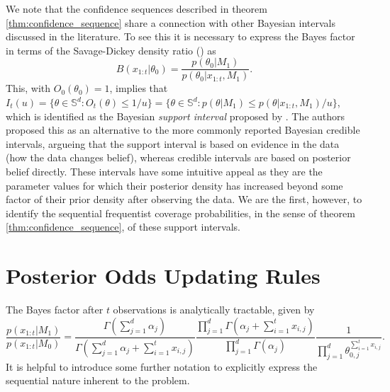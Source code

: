 \documentclass[11pt]{article}
\begin{document}
We note that the confidence sequences described in theorem \ref{thm:confidence_sequence} share a connection with other Bayesian intervals discussed in the literature.
To see this it is necessary to express the Bayes factor in terms of the Savage-Dickey density ratio (\cite{dickey}) as
\begin{equation}
    B(x_{1:t}|\theta_0) = \frac{p(\theta_0| M_1)}{p(\theta_0|x_{1:t},M_1)}.
\end{equation}
This, with $O_0(\theta_0)=1$, implies that $I_t(u) = \lbrace \theta \in \mathbb{S}^d : O_t(\theta) \leq 1/u \rbrace = \lbrace \theta  \in \mathbb{S}^d : p(\theta| M_1)\leq p(\theta|x_{1:t}, M_1)/u \rbrace $, which is identified as the Bayesian \textit{support interval} proposed by \cite{support_interval}.
The authors proposed this as an alternative to the more commonly reported Bayesian credible intervals, argueing that the support interval is based on evidence in the data (how the data changes belief), whereas credible intervals are based on posterior belief directly.
These intervals have some intuitive appeal as they are the parameter values for which their posterior density has increased beyond some factor of their prior density after observing the data.
We are the first, however, to identify the sequential frequentist coverage probabilities, in the sense of theorem \ref{thm:confidence_sequence}, of these support intervals.






\appendix
\section{Posterior Odds Updating Rules}
\label{app:posterior_odds}
The Bayes factor after $t$ observations is analytically tractable, given by
\begin{equation}
  \label{eq:bayes_factor}
 \frac{p(x_{1:t}|M_1)}{p(x_{1:t}|M_0)} = \frac{\Gamma(\sum_{j=1}^{d} \alpha_j)}{\Gamma(\sum_{j=1}^{d} \alpha_j + \sum_{i=1}^{t}x_{i,j})}\frac{\prod_{j=1}^{d}\Gamma(\alpha_j + \sum_{i=1}^{t}x_{i,j} )}{\prod_{j=1}^{d}\Gamma(\alpha_j )}\frac{1}{\prod_{j=1}^{d} \theta_{0,j}^{\sum_{i=1}^{t}x_{i,j}}}.
\end{equation}
It is helpful to introduce some further notation to explicitly express the sequential nature inherent to the problem.
\end{document}
